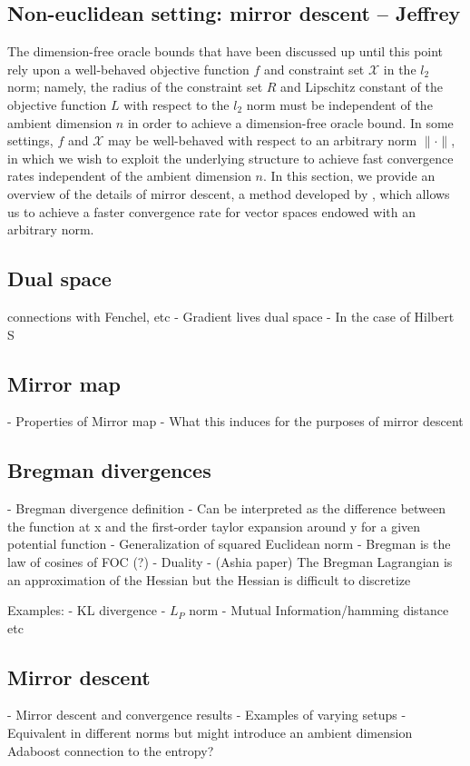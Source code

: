 

\subsection{Non-euclidean setting: mirror descent -- Jeffrey}
The dimension-free oracle bounds that have been discussed up until this point rely upon a well-behaved objective function $f$ and constraint set $\mathcal{X}$ in the $l_2$ norm; namely, the radius of the constraint set $R$ and Lipschitz constant of the objective function $L$ with respect to the $l_2$ norm must be independent of the ambient dimension $n$ in order to achieve a dimension-free oracle bound. In some settings, $f$ and $\mathcal{X}$ may be well-behaved with respect to an arbitrary norm $\|\cdot \|$, in which we wish to exploit the underlying structure to achieve fast convergence rates independent of the ambient dimension $n$. In this section, we provide an overview of the details of mirror descent, a method developed by \cite{blair1985problem}, which allows us to achieve a faster convergence rate for vector spaces endowed with an arbitrary norm. 


\subsection{Dual space}
connections with Fenchel, etc
- Gradient lives dual space
- In the case of Hilbert S

\subsection{Mirror map}
- Properties of Mirror map
- What this induces for the purposes of mirror descent

\subsection{Bregman divergences}
 - Bregman divergence definition
 - Can be interpreted as the difference between the function at x and the first-order taylor expansion around y for a given potential function
 - Generalization of squared Euclidean norm
 - Bregman is the law of cosines of FOC (?)
 - Duality
 - (Ashia paper) The Bregman Lagrangian is an approximation of the Hessian but the Hessian is difficult to discretize

Examples:
- KL divergence
- $L_P$ norm
- Mutual Information/hamming distance etc

\subsection{Mirror descent}
- Mirror descent and convergence results
- Examples of varying setups
- Equivalent in different norms but might introduce an ambient dimension
Adaboost connection to the entropy?


